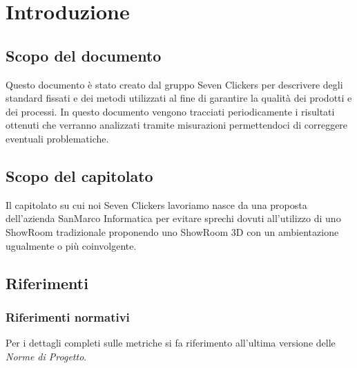 \section{Introduzione}
\subsection{Scopo del documento}
Questo documento è stato creato dal gruppo Seven Clickers per descrivere degli standard fissati e dei metodi utilizzati al fine di garantire la qualità dei prodotti e dei processi.
In questo documento vengono tracciati periodicamente i risultati ottenuti che verranno analizzati tramite misurazioni permettendoci di correggere eventuali problematiche.

\subsection{Scopo del capitolato}
Il capitolato su cui noi Seven Clickers lavoriamo nasce da una proposta dell'azienda SanMarco Informatica per evitare sprechi dovuti all'utilizzo di uno ShowRoom tradizionale proponendo uno ShowRoom 3D con un ambientazione ugualmente o più coinvolgente.

\subsection{Riferimenti}
\subsubsection{Riferimenti normativi}
Per i dettagli completi sulle metriche si fa riferimento all'ultima versione delle \textit{Norme di Progetto}.

